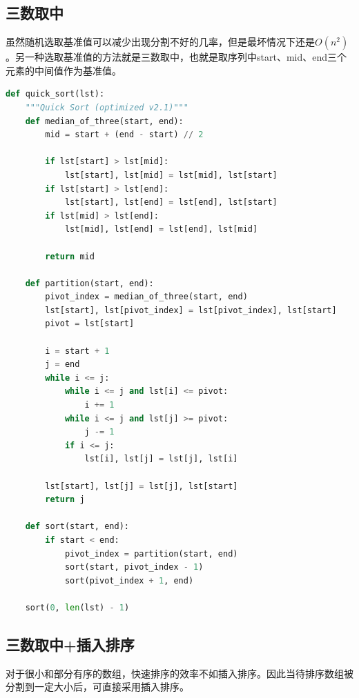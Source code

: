 \vspace{0.5cm}

\subsection{三数取中}

虽然随机选取基准值可以减少出现分割不好的几率，但是最坏情况下还是$ O(n^2) $。另一种选取基准值的方法就是三数取中，也就是取序列中start、mid、end三个元素的中间值作为基准值。\\


\begin{lstlisting}[language=Python]
def quick_sort(lst):
    """Quick Sort (optimized v2.1)"""
    def median_of_three(start, end):
        mid = start + (end - start) // 2

        if lst[start] > lst[mid]:
            lst[start], lst[mid] = lst[mid], lst[start]
        if lst[start] > lst[end]:
            lst[start], lst[end] = lst[end], lst[start]
        if lst[mid] > lst[end]:
            lst[mid], lst[end] = lst[end], lst[mid]
        
        return mid

    def partition(start, end):
        pivot_index = median_of_three(start, end)
        lst[start], lst[pivot_index] = lst[pivot_index], lst[start]
        pivot = lst[start]

        i = start + 1
        j = end
        while i <= j:
            while i <= j and lst[i] <= pivot:
                i += 1
            while i <= j and lst[j] >= pivot:
                j -= 1
            if i <= j:
                lst[i], lst[j] = lst[j], lst[i]
        
        lst[start], lst[j] = lst[j], lst[start]
        return j

    def sort(start, end):
        if start < end:
            pivot_index = partition(start, end)
            sort(start, pivot_index - 1)
            sort(pivot_index + 1, end)

    sort(0, len(lst) - 1)
\end{lstlisting}

\vspace{0.5cm}

\subsection{三数取中+插入排序}

对于很小和部分有序的数组，快速排序的效率不如插入排序。因此当待排序数组被分割到一定大小后，可直接采用插入排序。\\

